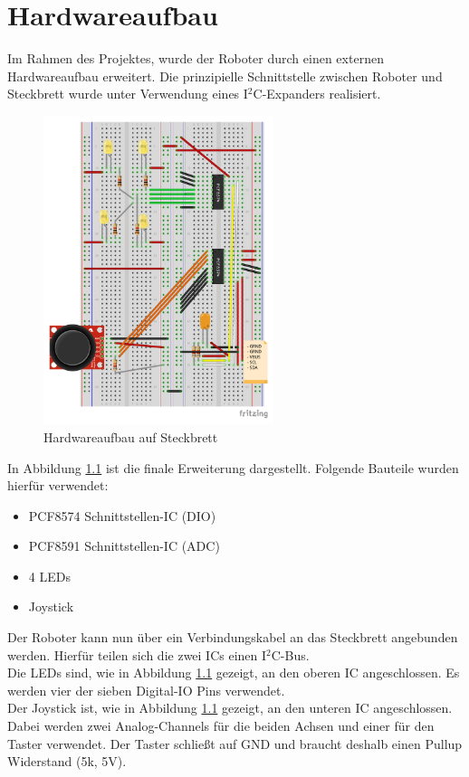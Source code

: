 \chapter{Hardwareaufbau}
Im Rahmen des Projektes, wurde der Roboter durch einen externen Hardwareaufbau erweitert. Die prinzipielle Schnittstelle zwischen Roboter und Steckbrett wurde unter Verwendung eines I$^2$C-Expanders realisiert.
\begin{figure}[h]
	\centering
		\includegraphics[page=1,width=0.6\textwidth]{Dokumente/Schaltplan.pdf}
	\caption{Hardwareaufbau auf Steckbrett}
	\label{fig:hardwareaufbau}
\end{figure}
\clearpage
\newpage
In Abbildung \ref{fig:hardwareaufbau} ist die finale Erweiterung dargestellt. Folgende Bauteile wurden hierfür verwendet:
\begin{itemize}
	\item PCF8574 Schnittstellen-IC (DIO)
    \item PCF8591 Schnittstellen-IC (ADC)
	\item 4 LEDs
	\item Joystick
\end{itemize}
Der Roboter kann nun über ein Verbindungskabel an das Steckbrett angebunden werden. Hierfür teilen sich die zwei ICs einen I$^2$C-Bus.\\
Die LEDs sind, wie in Abbildung \ref{fig:hardwareaufbau} gezeigt, an den oberen IC angeschlossen. Es werden vier der sieben Digital-IO Pins verwendet.\\
Der Joystick ist, wie in Abbildung \ref{fig:hardwareaufbau} gezeigt, an den unteren IC angeschlossen. Dabei werden zwei Analog-Channels für die beiden Achsen und einer für den Taster verwendet. Der Taster schließt auf GND und braucht deshalb einen Pullup Widerstand (5k, 5V).